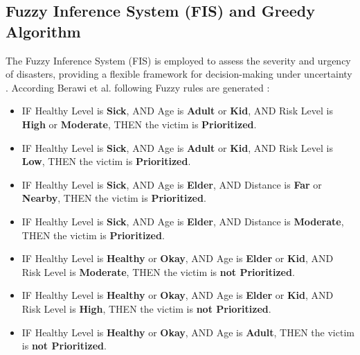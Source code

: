 \documentclass[journal,final,a4paper,twoside,11pt]{IEEEtran}
\begin{document}
\subsection{Fuzzy Inference System (FIS) and Greedy Algorithm}
The Fuzzy Inference System (FIS) is employed to assess the severity and urgency of disasters, providing a flexible framework for decision-making under uncertainty \cite{berawi2020prioritized}. According Berawi et al. following Fuzzy rules are generated :

\begin{itemize}
    \item IF Healthy Level is \textbf{Sick}, AND Age is \textbf{Adult} or \textbf{Kid}, AND Risk Level is \textbf{High} or \textbf{Moderate}, THEN the victim is \textbf{Prioritized}.
    
    \item IF Healthy Level is \textbf{Sick}, AND Age is \textbf{Adult} or \textbf{Kid}, AND Risk Level is \textbf{Low}, THEN the victim is \textbf{Prioritized}.
    
    \item IF Healthy Level is \textbf{Sick}, AND Age is \textbf{Elder}, AND Distance is \textbf{Far} or \textbf{Nearby}, THEN the victim is \textbf{Prioritized}.
    
    \item IF Healthy Level is \textbf{Sick}, AND Age is \textbf{Elder}, AND Distance is \textbf{Moderate}, THEN the victim is \textbf{Prioritized}.
    
    \item IF Healthy Level is \textbf{Healthy} or \textbf{Okay}, AND Age is \textbf{Elder} or \textbf{Kid}, AND Risk Level is \textbf{Moderate}, THEN the victim is \textbf{not Prioritized}.
    
    \item IF Healthy Level is \textbf{Healthy} or \textbf{Okay}, AND Age is \textbf{Elder} or \textbf{Kid}, AND Risk Level is \textbf{High}, THEN the victim is \textbf{not Prioritized}.
    
    \item IF Healthy Level is \textbf{Healthy} or \textbf{Okay}, AND Age is \textbf{Adult}, THEN the victim is \textbf{not Prioritized}.
\end{itemize}
\end{document}

